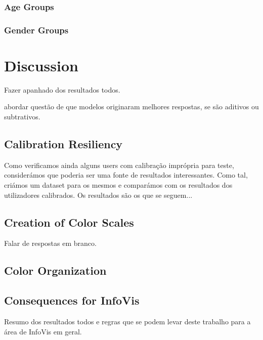\subsubsection{Age Groups}
\label{subsubsec:demo_age}
%
\subsubsection{Gender Groups}
\label{subsubsec:demo_age}
%
%
\section{Discussion}
\label{sec:results_discussion}
%
Fazer apanhado dos resultados todos. \par
abordar questão de que modelos originaram melhores respostas, se são aditivos ou subtrativos. \\
%
\subsection{Calibration Resiliency}
\label{subsec:results_calibration}
%
Como verificamos ainda alguns users com calibração imprópria para teste, considerámos que poderia ser uma fonte de resultados
interessantes. Como tal, criámos um dataset para os mesmos e comparámos com os resultados dos utilizadores calibrados. Os resultados
são os que se seguem... \par
%
\subsection{Creation of Color Scales}
\label{subsec:results_discussion_colorscales}
%
Falar de respostas em branco. \par
%
\subsection{Color Organization}
\label{subsec:results_discussion_colororganization}

\subsection{Consequences for InfoVis}
\label{subsec:results_discussion_infovis}
%
Resumo dos resultados todos e regras que se podem levar deste trabalho para a área de InfoVis em geral.
%

